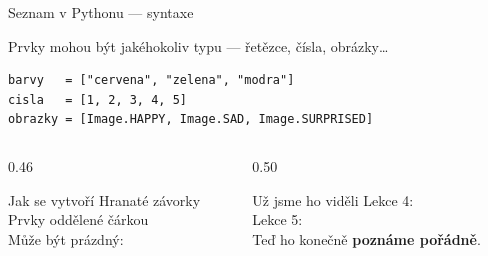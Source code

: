 \begin{frame}[fragile]{Seznam v Pythonu — syntaxe}

  Prvky mohou být jakéhokoliv typu — řetězce, čísla, obrázky\ldots

  \bigskip
  \begin{lstlisting}
barvy   = ["cervena", "zelena", "modra"]
cisla   = [1, 2, 3, 4, 5]
obrazky = [Image.HAPPY, Image.SAD, Image.SURPRISED]
  \end{lstlisting}

  \bigskip
  \begin{columns}[T]
    \begin{column}{0.46\textwidth}
      \begin{block}{Jak se vytvoří}
        Hranaté závorky \pyinline{[]}\\
        Prvky oddělené čárkou\\
        Může být prázdný: \pyinline{[]}
      \end{block}
    \end{column}
    \begin{column}{0.50\textwidth}
      \begin{block}{Už jsme ho viděli}
        Lekce 4: \\
        Lekce 5: \\
        Teď ho konečně \textbf{poznáme pořádně}.
      \end{block}
    \end{column}
  \end{columns}
\end{frame}

